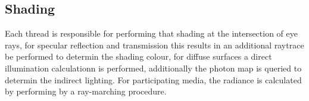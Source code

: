 \subsection{Shading}
Each thread is responsible for performing that shading at the intersection of eye rays, for specular reflection
and transmission this results in an additional raytrace be performed to determin the shading colour, for diffuse
surfaces a direct illumination calculationn is performed, additionally the photon map is queried to determin
the indirect lighting. For participating media, the radiance is calculated by performing by a ray-marching
procedure.
